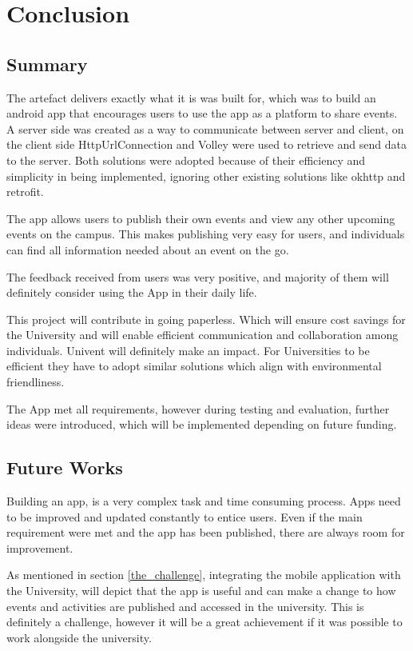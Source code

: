 \chapter{Conclusion}
\section{Summary}
The artefact delivers exactly what it is was built for, which was to build an android app that encourages users to use the app as a platform to share events. A server side was created as a way to communicate between server and client, on the client side HttpUrlConnection and Volley were used to retrieve and send data to the server. Both solutions were adopted because of their efficiency  and simplicity in being implemented, ignoring other existing solutions like okhttp and retrofit.

The app allows users to publish their own events and view any other upcoming events on the campus. This makes publishing very easy for users, and individuals can find all information needed about an event on the go. 

The feedback received from users was very positive, and majority of them will definitely consider using the App in their daily life. 

This project will contribute in going paperless. Which will ensure cost savings for the University and will enable efficient communication and collaboration among individuals. Univent will definitely make an impact. For Universities to be efficient they have to adopt similar solutions which align with environmental friendliness. 

The App met all requirements, however during testing and evaluation, further ideas were introduced, which will be implemented depending on future funding.

\section{Future Works}
Building an app, is a very complex task and time consuming process.
Apps need to be improved and updated constantly to entice users. Even if the main requirement were met and the app has been published, there are always room for improvement.

As mentioned in section \ref{the_challenge}, integrating the mobile application with the University, will depict that the app is useful and can make a change to how events and activities are published and accessed in the university. This is definitely a challenge, however it will be a great achievement if it was possible to work alongside the university.

